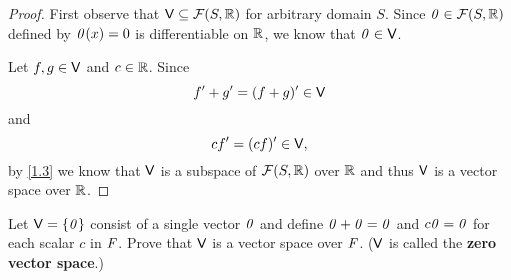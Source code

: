 \begin{proof}
	First observe that \(\V \subseteq \fs{S}{\R}\) for arbitrary domain \(S\).
	Since \(\zv \in \fs{S}{\R}\) defined by \(\mathit{0}(x) = 0\) is differentiable on \(\mathbb{R}\), we know that \(\mathit{0} \in \mathsf{V}\).

	Let \(f, g \in \mathsf{V}\) and \(c \in \mathbb{R}\).
	Since
	\[
		f' + g' = (f + g)' \in \mathsf{V}
	\]
	and
	\[
		cf' = (cf)' \in \mathsf{V},
	\]
	by \cref{1.3} we know that \(\mathsf{V}\) is a subspace of \(\fs{S}{\R}\) over \(\mathbb{R}\) and thus \(\mathsf{V}\) is a vector space over \(\mathbb{R}\).
\end{proof}

\begin{ex}\label{ex:1.2.11}
	Let \(\mathsf{V} = \left\lbrace\mathit{0}\right\rbrace\) consist of a single vector \(\mathit{0}\) and define \(\mathit{0} + \mathit{0} = \mathit{0}\) and \(c\mathit{0} = \mathit{0}\) for each scalar \(c\) in \(\mathit{F}\).
	Prove that \(\mathsf{V}\) is a vector space over \(\mathit{F}\).
	(\(\mathsf{V}\) is called the \textbf{zero vector space}.)
\end{ex}

